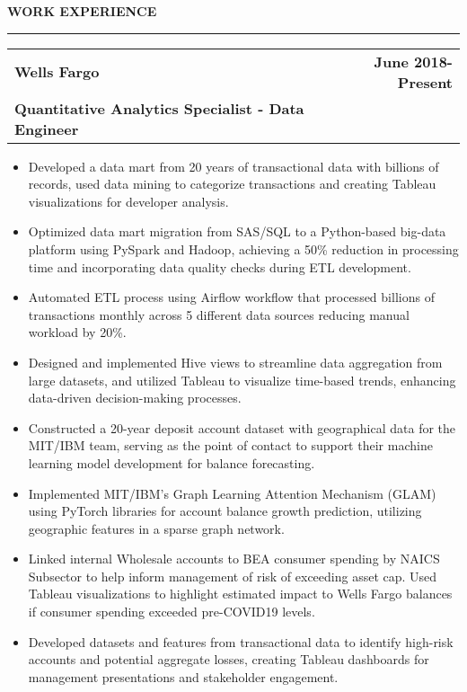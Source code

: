 \documentclass[a4paper,10pt]{article}
\begin{document}
\noindent
\textbf{WORK EXPERIENCE}\vspace{-3mm}\\
\hrule height 2pt
\vspace{2mm}
\noindent
\begin{tabular}{p{} r}
   \textbf{Wells Fargo} & \textbf{June 2018-Present }\\
    \textbf{Quantitative Analytics Specialist - Data Engineer} & \\    
\end{tabular}
\begin{itemize}
  \item Developed a data mart from 20 years of transactional data with billions of records, used data mining to categorize transactions and creating Tableau visualizations for developer analysis.
  \item Optimized data mart migration from SAS/SQL to a Python-based big-data platform using PySpark and Hadoop, achieving a 50\% reduction in processing time and incorporating data quality checks during ETL development.
  \item Automated ETL process using Airflow workflow that processed billions of transactions monthly across 5 different data sources reducing manual workload by 20\%.
  \item Designed and implemented Hive views to streamline data aggregation from large datasets, and utilized Tableau to visualize time-based trends, enhancing data-driven decision-making processes.
  \item Constructed a 20-year deposit account dataset with geographical data for the MIT/IBM team, serving as the point of contact to support their machine learning model development for balance forecasting.
  \item Implemented MIT/IBM's Graph Learning Attention Mechanism (GLAM) using PyTorch libraries for account balance growth prediction, utilizing geographic features in a sparse graph network.
  \item Linked internal Wholesale accounts to BEA consumer spending by NAICS Subsector to help inform management of risk of exceeding asset cap. Used Tableau visualizations to highlight estimated impact to Wells Fargo balances if consumer spending exceeded pre-COVID19 levels.
  \item Developed datasets and features from transactional data to identify high-risk accounts and potential aggregate losses, creating Tableau dashboards for management presentations and stakeholder engagement.
\end{itemize}
\end{document}
